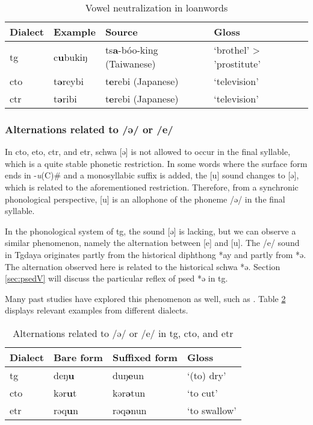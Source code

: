 \begin{table}[!htbp]
\centering
\caption{Vowel neutralization in loanwords}
\label{tab:Vneu_loan}
\begin{tabular}{llll}
\hline
Dialect   & Example & Source                   & Gloss                    \\ \hline
\acl{tg}  & c\textbf{u}bukiŋ & ts\textbf{a}-bóo-king (Taiwanese) & `brothel' > 'prostitute' \\
\acl{cto} & t\textbf{ə}reybi & t\textbf{e}rebi (Japanese)        & `television'             \\
\acl{ctr} & t\textbf{ə}ribi  & t\textbf{e}rebi (Japanese)        & `television'                \\ \hline
\end{tabular}
\end{table}

\subsubsection{Alternations related to /ə/ or /e/} \label{sec:eu_alt}

In \acl{cto}, \acl{eto}, \acl{ctr}, and \acl{etr}, schwa [ə] is not allowed to occur in the final syllable, which is a quite stable phonetic restriction. In some words where the surface form ends in -\textit{u}(C)\# and a monosyllabic suffix is added, the [u] sound changes to [ə], which is related to the aforementioned restriction. Therefore, from a synchronic phonological perspective, [u] is an allophone of the phoneme /ə/ in the final syllable. 

In the phonological system of \acl{tg}, the sound [ə] is lacking, but we can observe a similar phenomenon, namely the alternation between [e] and [u]. The /e/ sound in Tgdaya originates partly from the historical diphthong *ay and partly from *ə. The alternation observed here is related to the historical schwa *ə. Section \ref{sec:psedV} will discuss the particular reflex of \acl{psed} *ə in \acl{tg}.

Many past studies have explored this phenomenon as well, such as \textcite{yang1976sedpho,Sung2018Sedgrammar,Lee2018Trugrammar}. Table \ref{tab:eu_alt} displays relevant examples from different dialects.

\begin{table}[!htbp]
\centering
\caption{Alternations related to /ə/ or /e/ in \acl{tg}, \acl{cto}, and \acl{etr}}
\label{tab:eu_alt}
\begin{tabular}{llll}
\hline
Dialect   & Bare form & Suffixed form & Gloss        \\ \hline
\acl{tg}  & deŋ\textbf{u}      & duŋ\textbf{e}un        & `(to) dry'   \\
\acl{cto} & kər\textbf{u}t     & kər\textbf{ə}tun       & `to cut'     \\
\acl{etr} & rəq\textbf{u}n     & rəq\textbf{ə}nun       & `to swallow' \\ \hline
\end{tabular}
\end{table}

